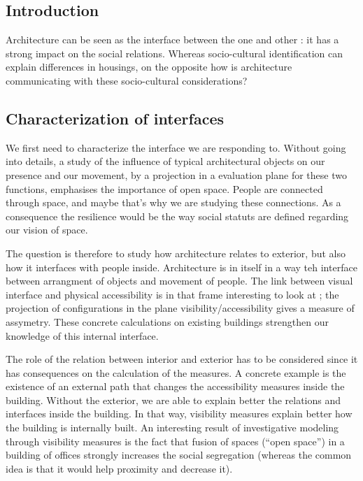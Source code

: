 \documentclass[english]{article}
\begin{document}
\subsection*{Introduction}

Architecture can be seen as the interface between the one and other
: it has a strong impact on the social relations. Whereas socio-cultural
identification can explain differences in housings, on the opposite
how is architecture communicating with these socio-cultural considerations?

\bigskip{}



\subsection*{Characterization of interfaces}

We first need to characterize the interface we are responding to.
Without going into details, a study of the influence of typical architectural
objects on our presence and our movement, by a projection in a evaluation
plane for these two functions, emphasises the importance of open space.
People are connected through space, and maybe that's why we are studying
these connections. As a consequence the resilience would be the way
social statuts are defined regarding our vision of space.

\bigskip{}


The question is therefore to study how architecture relates to exterior,
but also how it interfaces with people inside. Architecture is in
itself in a way teh interface between arrangment of objects and movement
of people. The link between visual interface and physical accessibility
is in that frame interesting to look at ; the projection of configurations
in the plane visibility/accessibility gives a measure of assymetry.
These concrete calculations on existing buildings strengthen our knowledge
of this internal interface.

\bigskip{}


The role of the relation between interior and exterior has to be considered
since it has consequences on the calculation of the measures. A concrete
example is the existence of an external path that changes the accessibility
measures inside the building. Without the exterior, we are able to
explain better the relations and interfaces inside the building. In
that way, visibility measures explain better how the building is internally
built. An interesting result of investigative modeling through visibility
measures is the fact that fusion of spaces (``open space'') in a
building of offices strongly increases the social segregation (whereas
the common idea is that it would help proximity and decrease it).
\end{document}
